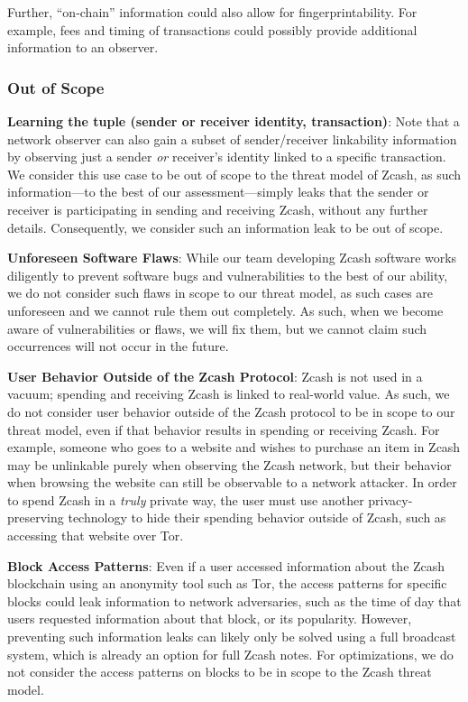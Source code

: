 \documentclass{article}
\begin{document}
Further, ``on-chain'' information could also allow for fingerprintability. For
example, fees and timing of transactions could possibly provide additional
information to an observer.

\subsubsection{Out of Scope}

\textbf{Learning the tuple (sender or receiver identity, transaction)}:
Note that a network observer can also gain a subset of sender/receiver
linkability information by
observing just a sender \emph{or} receiver's identity linked to a specific
transaction. We consider this use case to be out of scope to the threat model
of Zcash, as such
information---to the best of our assessment---simply leaks that the sender or
receiver is participating in sending and receiving Zcash, without any further
details. Consequently, we consider such an information leak to be out of scope.

\textbf{Unforeseen Software Flaws}: While our team developing Zcash software
works diligently to prevent software bugs and vulnerabilities to the best of
our ability, we do not
consider such flaws in scope to our threat model, as such cases are unforeseen
and we cannot rule them out completely. As such, when we become aware of
vulnerabilities or flaws, we will fix them, but we cannot claim such
occurrences will not occur in the future.

\textbf{User Behavior Outside of the Zcash Protocol}: Zcash is not used in a
vacuum; spending and receiving Zcash is linked to real-world value. As such, we
do not consider user behavior outside of the Zcash protocol to be in scope to
our threat model, even if that behavior results in spending or receiving Zcash.
For example, someone who goes to a website and wishes to purchase an item in
Zcash may be unlinkable purely when observing the Zcash network, but their
behavior when browsing the website can still be observable to a network
attacker. In order to spend Zcash in a \emph{truly} private way, the user must
use another privacy-preserving technology to hide their spending behavior
outside of Zcash, such as accessing that website over Tor.

\textbf{Block Access Patterns}: Even if a user accessed
information about the Zcash blockchain using an anonymity tool such as Tor, the
access patterns for specific blocks could leak information to network
adversaries, such as the time of day that users requested information about
that block, or its popularity. However, preventing such information leaks
can likely only be solved using a full broadcast system, which is already
an option for full Zcash notes. For optimizations, we do not consider the
access patterns on blocks to be in scope to the Zcash threat model.
\end{document}
